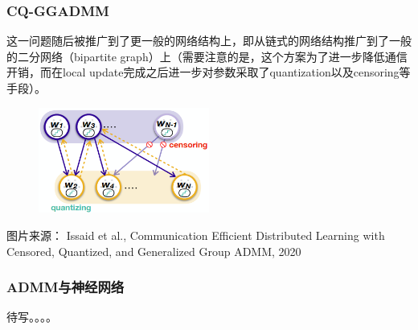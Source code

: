 
\begin{frame}
\frametitle{CQ-GGADMM}

这一问题随后被推广到了更一般的网络结构上，即从链式的网络结构推广到了一般的二分网络（bipartite graph）上（需要注意的是，这个方案为了进一步降低通信开销，而在local update完成之后进一步对参数采取了quantization以及censoring等手段）。

\begin{figure}[H]
    \centering
    \includegraphics[width=0.5\textwidth,keepaspectratio]{images/CQ-GGADMM.png}
\end{figure}
{\scriptsize 图片来源：\cite{issaid2020cq-ggadmm} Issaid et al., Communication Efficient Distributed Learning with Censored, Quantized, and Generalized Group ADMM, 2020}

\end{frame}


\begin{frame}
\frametitle{ADMM与神经网络}

待写。。。。

\end{frame}










